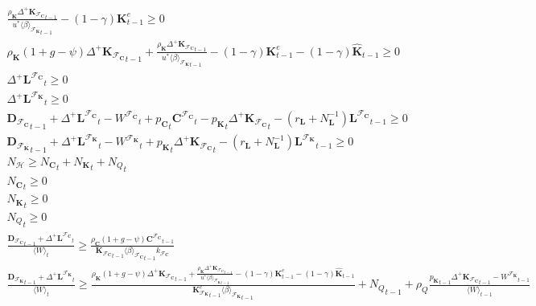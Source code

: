 \documentclass[a4paper, headings=standardclasses]{scrartcl}
\numberwithin{equation}{subsection}
\begin{document}
{\begin{gather}
		\frac{\rho_\mathbf{K} {\Delta^+\mathbf{K}_{\mathcal{F}_\mathbf{C}}}_{t-1}}{u^* {\langle \beta \rangle_{\mathcal{F}_\mathbf{K}}}_{t-1}} - (1-\gamma) \mathbf{K}^e_{t-1} \ge 0\\
		\rho_\mathbf{K} (1 + g - \psi){\Delta^+\mathbf{K}_{\mathcal{F}_\mathbf{C}}}_{t-1} +  \frac{\rho_\mathbf{K} {\Delta^+\mathbf{K}_{\mathcal{F}_\mathbf{C}}}_{t-1}}{u^* {\langle \beta \rangle_{\mathcal{F}_\mathbf{K}}}_{t-1}} - (1-\gamma) \mathbf{K}^e_{t-1} - (1-\gamma)\hat{\mathbf{K}}_{t-1} \ge 0 \\
		{\Delta^+{\mathbf{L}^{\mathcal{F}_\mathbf{C}}}}_t \ge 0 \\
		{\Delta^+{\mathbf{L}^{\mathcal{F}_\mathbf{K}}}}_t \ge 0 \\
		{\mathbf{D}_{\mathcal{F}_\mathbf{C}}}_{t-1} + {\Delta^+{\mathbf{L}^{\mathcal{F}_\mathbf{C}}}}_t - {W^{\mathcal{F}_\mathbf{C}}}_t + {p_{\mathbf{C}}}_t {\mathbf{C}^{\mathcal{F}_\mathbf{C}}}_t - {p_{\mathbf{K}}}_t {\Delta^+{\mathbf{K}_{\mathcal{F}_\mathbf{C}}}}_t - (r_\mathbf{L} + N_\mathbf{L}^{-1}) {\mathbf{L}^{\mathcal{F}_\mathbf{C}}}_{t-1} \ge 0 \\
		{\mathbf{D}_{\mathcal{F}_\mathbf{K}}}_{t-1} + {\Delta^+{\mathbf{L}^{\mathcal{F}_\mathbf{K}}}}_t - {W^{\mathcal{F}_\mathbf{K}}}_t +  {p_{\mathbf{K}}}_t {\Delta^+{\mathbf{K}_{\mathcal{F}_\mathbf{C}}}}_t - (r_\mathbf{L} + N_\mathbf{L}^{-1}) {\mathbf{L}^{\mathcal{F}_\mathbf{K}}}_{t-1} \ge 0 \\
		N_\mathcal{H} \ge {N_\mathbf{C}}_t + {N_\mathbf{K}}_t + {N_Q}_t \\
		{N_\mathbf{C}}_t \ge 0 \\
		{N_\mathbf{K}}_t \ge 0 \\
		{N_Q}_t \ge 0 \\
		\frac{{\mathbf{D}_{\mathcal{F}_\mathbf{C}}}_{t-1} + {\Delta^+{\mathbf{L}^{\mathcal{F}_\mathbf{C}}}}_{t}}{{\langle W \rangle}_t} \ge \frac{\rho_\mathbf{C} (1 + g - \psi) {\mathbf{C}^{\mathcal{F}_\mathbf{C}}}_{t-1}}{{\mathbf{K}_{\mathcal{F}_\mathbf{C}}}_{t-1} {\langle \beta \rangle_{\mathcal{F}_\mathbf{C}}}_{t-1} k_{\mathcal{F}_\mathbf{C}}} \\
		\frac{{\mathbf{D}_{\mathcal{F}_\mathbf{K}}}_{t-1} + {\Delta^+{\mathbf{L}^{\mathcal{F}_\mathbf{K}}}}_{t}}{{\langle W \rangle}_t} \ge \frac{\rho_\mathbf{K} (1 + g - \psi){\Delta^+\mathbf{K}_{\mathcal{F}_\mathbf{C}}}_{t-1} + \frac{\rho_\mathbf{K} {\Delta^+\mathbf{K}_{\mathcal{F}_\mathbf{C}}}_{t-1}}{u^* {\langle \beta \rangle_{\mathcal{F}_\mathbf{K}}}_{t-1}} - (1-\gamma) \mathbf{K}^e_{t-1} - (1-\gamma)\hat{\mathbf{K}}_{t-1}}{{\mathbf{K}_{\mathcal{F}_\mathbf{K}}^e}_{t-1} {\langle \beta \rangle_{\mathcal{F}_\mathbf{K}}}_{t-1}} + {N_Q}_{t-1} + \rho_Q \frac{{p_\mathbf{K}}_{t-1} {\Delta^+ \mathbf{K}_{\mathcal{F}_\mathbf{C}}}_{t-1} - {W^{\mathcal{F}_\mathbf{K}}}_{t-1}}{\langle W \rangle_{t-1}}
	\end{gather}
}
\end{document}
